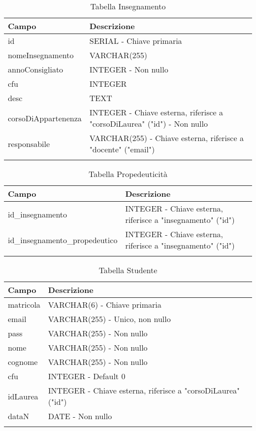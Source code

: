 \begin{table}[ht]
\centering
\caption{Tabella Insegnamento}
\begin{tabularx}{\textwidth}{lX}
\toprule
\textbf{Campo} & \textbf{Descrizione} \\
\midrule
id & SERIAL - Chiave primaria \\
nomeInsegnamento & VARCHAR(255) \\
annoConsigliato & INTEGER - Non nullo \\
cfu & INTEGER \\
desc & TEXT\\
corsoDiAppartenenza & INTEGER - Chiave esterna, riferisce a "corsoDiLaurea" ("id") - Non nullo \\

responsabile & VARCHAR(255) - Chiave esterna, riferisce a "docente" ("email") \\

\bottomrule
\label{tab:insegnamento}

\end{tabularx}
\end{table}

\begin{table}[ht]
\centering
\caption{Tabella Propedeuticità}
\begin{tabularx}{\textwidth}{lX}
\toprule
\textbf{Campo} & \textbf{Descrizione} \\
\midrule
id\_insegnamento & INTEGER - Chiave esterna, riferisce a "insegnamento" ("id") \\
id\_insegnamento\_propedeutico & INTEGER - Chiave esterna, riferisce a "insegnamento" ("id") \\
\bottomrule
\label{tab:propedeuticità}

\end{tabularx}
\end{table}


\begin{table}[ht]
\centering
\caption{Tabella Studente}
\begin{tabularx}{\textwidth}{lX}
\toprule
\textbf{Campo} & \textbf{Descrizione} \\
\midrule
matricola & VARCHAR(6) - Chiave primaria \\
email & VARCHAR(255) - Unico, non nullo \\
pass & VARCHAR(255) - Non nullo \\
nome & VARCHAR(255) - Non nullo \\
cognome & VARCHAR(255) - Non nullo \\
cfu & INTEGER - Default 0 \\
idLaurea & INTEGER - Chiave esterna, riferisce a "corsoDiLaurea" ("id") \\
dataN & DATE - Non nullo \\
\bottomrule
\label{tab:studente}

\end{tabularx}
\end{table}



